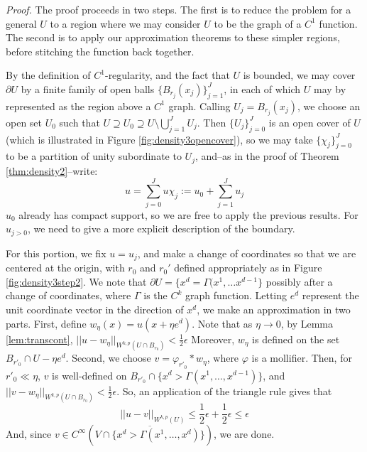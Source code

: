 \documentclass[letterpaper,10pt]{article}
\newcommand{\wkp}{W^{k,p}}
\theoremstyle{definition}
\theoremstyle{remark}
\theoremstyle{plain}
\renewenvironment{proof}{
    \vspace{5pt}
    \begin{mdframed}[bottomline=false,topline=false,rightline=false, skipabove=0]
    \noindent\textit{Proof.}}
{
    \hspace{\fill}\qedsymbol
    \end{mdframed}
}
\begin{document}
\begin{proof}
    The proof proceeds in two steps. The first is to reduce the problem for a
    general $U$ to a region where we may consider $U$ to be the graph of a $C^1$
    function.
    The second is to apply our approximation theorems to these simpler regions,
    before stitching the function back together.
    
    By the definition of $C^1$-regularity, and the fact that $U$ is bounded,
    we may cover $\partial U$ by a finite family of 
    open balls $\{B_{r_j}(x_j)\}_{j=1}^J$, in each of which $U$  may by
    represented as the region above a $C^1$ graph.
    Calling $U_j=B_{r_j}(x_j)$, we choose an open set $U_0$ such that 
    $U\supseteq U_0\supseteq U\setminus\bigcup_{j=1}^J U_j$.
    Then $\{U_j\}_{j=0}^J$ is an open cover of $U$ (which is illustrated in Figure \ref{fig:density3opencover}), so we may take $\{\chi_j\}_{j=0}^J$
    to be a partition of unity subordinate to $U_j$, and--as in the proof of 
    Theorem \ref{thm:density2}--write:
    $$
    u=\sum_{j=0}^{J}u\chi_j:=u_0+\sum_{j=1}^{J}u_j
    $$
    $u_0$ already has compact support, so we are free to apply the previous results.
    For $u_{j>0}$, we need to give a more explicit description of the boundary.

    For this portion, we fix $u=u_j$, and make a change of coordinates so 
    that we are centered at the origin, with $r_0$ and $r_0'$ defined appropriately 
    as in Figure \ref{fig:density3step2}.
    We note that $\partial U=\{x^d=\Gamma(x^1,\ldots x^{d-1}\}$ possibly after 
    a change of coordinates, where $\Gamma$ is the $C^k$ graph function.
    Letting $e^d$ represent the unit coordinate vector in the direction of $x^d$, 
    we make an approximation in two parts.
    First, define $w_\eta(x)=u(x+\eta e^d)$. Note that as $\eta\rightarrow 0$, by
    Lemma \ref{lem:transcont}, $||u-w_\eta||_{\wkp(U\cap B_{r_0})}<\frac{1}{2}\epsilon$
    Moreover, $w_\eta$ is defined on the set $B_{r'_0}\cap U-\eta e^d$.
    Second, we choose $v=\varphi_{r'_0}*w_\eta$, where $\varphi$ is a mollifier.
    Then, for $r'_0\ll\eta$, $v$ is well-defined on $B_{r'_0}\cap\{x^d>\Gamma(x^1,\ldots,x^{d-1})\}$,
    and $||v-w_\eta||_{\wkp(U\cap B_{r_0})}<\frac{1}{2}\epsilon$.
    So, an application of the triangle rule gives that 
    $$
        ||u-v||_{\wkp(U)}\leq\frac{1}{2}\epsilon+\frac{1}{2}\epsilon\leq\epsilon
    $$
    And, since $v\in C^\infty(\overline{V\cap\{x^d>\Gamma(x^1,\ldots, x^d)\}})$,
    we are done.
\end{proof}
\end{document}
